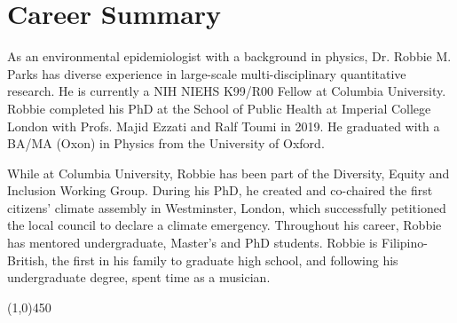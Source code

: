 \section*{Career Summary}

As an environmental epidemiologist with a background in physics, Dr. Robbie M. Parks has diverse experience in large-scale multi-disciplinary quantitative research. He is currently a NIH NIEHS K99/R00 Fellow at Columbia University. Robbie completed his PhD at the School of Public Health at Imperial College London with Profs. Majid Ezzati and Ralf Toumi in 2019. He graduated with a BA/MA (Oxon) in Physics from the University of Oxford. \medskip

\noindent While at Columbia University, Robbie has been part of the Diversity, Equity and Inclusion Working Group. During his PhD, he created and co-chaired the first citizens’ climate assembly in Westminster, London, which successfully petitioned the local council to declare a climate emergency. Throughout his career, Robbie has mentored undergraduate, Master’s and PhD students. Robbie is Filipino-British, the first in his family to graduate high school, and following his undergraduate degree, spent time as a musician.

\begin{center} \line(1,0){450} \end{center}